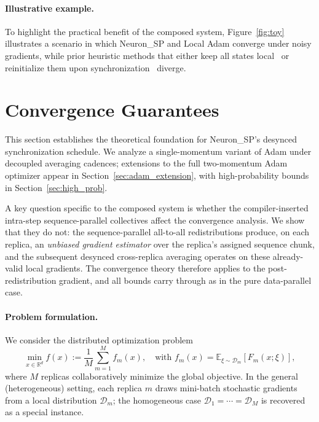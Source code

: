 \documentclass{article}
\begin{document}
\paragraph{Illustrative example.}
To highlight the practical benefit of the composed system,
Figure~\ref{fig:toy} illustrates a scenario in which Neuron\_SP and
Local Adam converge under noisy gradients, while prior heuristic methods
that either keep all states local~\citep{douillard2023diloco,sani2025photon}
or reinitialize them upon
synchronization~\citep{iacob2025dept,sani2024future} diverge.





\section{Convergence Guarantees}
\label{sec:convergence}

This section establishes the theoretical foundation for Neuron\_SP's desynced
synchronization schedule. We analyze a single-momentum variant of Adam under
decoupled averaging cadences; extensions to the full two-momentum Adam
optimizer appear in Section~\ref{sec:adam_extension}, with high-probability
bounds in Section~\ref{sec:high_prob}.

A key question specific to the composed system is whether the
compiler-inserted intra-step sequence-parallel collectives affect the
convergence analysis. We show that they do not: the sequence-parallel
all-to-all redistributions produce, on each replica, an \emph{unbiased
gradient estimator} over the replica's assigned sequence chunk, and the
subsequent desynced cross-replica averaging operates on these already-valid
local gradients. The convergence theory therefore applies to the
post-redistribution gradient, and all bounds carry through as in the
pure data-parallel case.

\paragraph{Problem formulation.}
We consider the distributed optimization problem
\begin{equation}
\min_{x \in \mathbb{R}^d} f(x) := \frac{1}{M} \sum_{m=1}^{M} f_m(x),
\quad \text{with } f_m(x) = \mathbb{E}_{\xi \sim \mathcal{D}_m}[F_m(x; \xi)],
\label{eq:objective}
\end{equation}
where $M$ replicas collaboratively minimize the global objective.
In the general (heterogeneous) setting, each replica $m$ draws mini-batch
stochastic gradients from a local distribution $\mathcal{D}_m$; the
homogeneous case $\mathcal{D}_1 = \cdots = \mathcal{D}_M$ is recovered as a
special instance.
\end{document}

